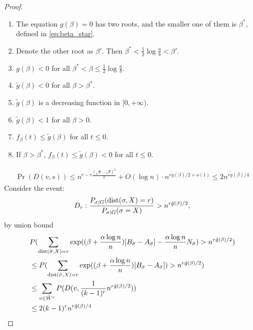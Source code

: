 \documentclass{article}
\begin{document}
\begin{proof}
\begin{lemma}
\begin{enumerate}[label=(\roman*)]
\item The equation $g(\beta) = 0$ has two roots, and the smaller one of them is $\beta^\ast$, defined in \eqref{eq:beta_star}.

\item Denote the other root as $\beta'$. Then
$\beta^\ast< \frac{1}{2}\log\frac{a}{b} <\beta'$.

\item $g(\beta)<0$ for all $\beta^\ast< \beta \le \frac{1}{2}\log\frac{a}{b}$.

\item $\tilde{g}(\beta)<0$ for all $\beta>\beta^\ast$.

\item $\tilde{g}(\beta)$ is a decreasing function in $[0,+\infty)$. 

\item $\tilde{g}(\beta)<1$ for all $\beta>0$.

\item $f_{\beta}(t)\le \tilde{g}(\beta)$ for all $t\le 0$.

\item If $\beta>\beta^\ast$, $f_{\beta}(t)\le \tilde{g}(\beta)<0$ for all $t\le 0$.

\end{enumerate}
\end{lemma}

\begin{align*}
\Pr( D(v,s)) \leq  n^{r-r\frac{(\sqrt{a}-\sqrt{b})^2}{k}} + O(\log n)  \cdot n^{r\tilde{g}(\beta)/2 + o(1)} \leq 2n^{r\tilde{g}(\beta)/4}
\end{align*}
Consider the event:
$$
D_r: \frac{P_{\sigma | G}(\operatorname{dist}(\sigma, X) = r)}{P_{\sigma | G}(\sigma = X)} > n^{r\tilde{g}(\beta)/2},
$$
by union bound
\begin{align*}
&P(\sum_{\operatorname{dist}(\bar{\sigma}, X)=r} \exp((\beta + \frac{\alpha \log n}{n})[B_{\bar{\sigma}} - A_{\bar{\sigma}}] - \frac{\alpha \log n}{n} N_{\bar{\sigma}}) > n^{r\tilde{g}(\beta)/2}) \\
&\leq P(\sum_{\operatorname{dist}(\bar{\sigma}, X)=r} \exp((\beta + \frac{\alpha \log n}{n})[B_{\bar{\sigma}} - A_{\bar{\sigma}}]) > n^{r\tilde{g}(\beta)/2}) \\
&\leq \sum_{v \in \bar{W}^r} P(D(v, \frac{1}{(k-1)^r} n^{r\tilde{g}(\beta)/2})) \\
& \leq 2(k-1)^r n^{r\tilde{g}(\beta)/4}
\end{align*}
\end{proof}
\end{document}
